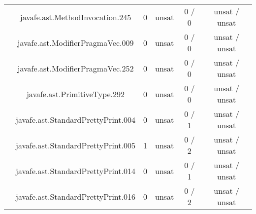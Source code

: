 \begin{table}[htbp]
\begin{minipage}{0.60\textwidth}
{\begin{tabular}[c]{c c!{\vrule width 1.5pt}c|c!{\vrule width 1.5pt}c|c|}
		 	& javafe.ast.MethodInvocation.245    			      & 0    & unsat   & 0  / 0    & unsat / unsat  \\
		 	& javafe.ast.ModifierPragmaVec.009  			      & 0    & unsat   & 0  / 0    & unsat / unsat  \\
 			& javafe.ast.ModifierPragmaVec.252    			      & 0    & unsat   & 0  / 0    & unsat / unsat  \\
 			&  javafe.ast.PrimitiveType.292   			      & 0    & unsat   & 0  / 0    & unsat / unsat  \\
 			&  javafe.ast.StandardPrettyPrint.004   		      & 0    & unsat   & 0  / 1    & unsat / unsat  \\
 			& javafe.ast.StandardPrettyPrint.005    		      & 1    & unsat   & 0  / 2    & unsat / unsat  \\
 			& javafe.ast.StandardPrettyPrint.014    		      & 0    & unsat   & 0  / 1    & unsat / unsat  \\
 			& javafe.ast.StandardPrettyPrint.016    		      & 0    & unsat   & 0  / 2    & unsat / unsat  \\

\end{tabular}}
\end{minipage}
\end{table}
